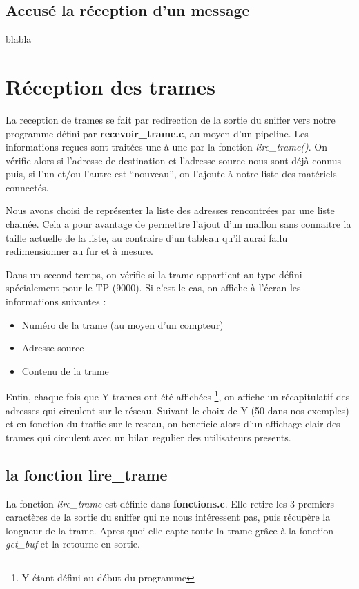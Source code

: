 \documentclass[a4paper,11pt]{article}
\begin{document}
	\subsection{Accusé la réception d'un message}
	blabla
	\section{Réception des trames}
	La reception de trames se fait par redirection de la sortie du sniffer vers notre programme défini par \textbf{recevoir\_trame.c}, au moyen d'un pipeline.
	Les informations reçues sont traitées une à une par la fonction \textit{lire\_trame()}. On vérifie alors si l'adresse de destination et l'adresse source nous sont déjà connus puis, si l'un et/ou l'autre est ``nouveau'', on l'ajoute à notre liste des matériels connectés.

	Nous avons choisi de représenter la liste des adresses rencontrées par une liste chainée. Cela a pour avantage de permettre l'ajout d'un maillon sans connaitre la taille actuelle de la liste, au contraire d'un tableau qu'il aurai fallu redimensionner au fur et à mesure.
	
	Dans un second temps, on vérifie si la trame appartient au type défini spécialement pour le TP (9000). Si c'est le cas, on affiche à l'écran les informations suivantes :
	\begin{itemize}
		\item Numéro de la trame (au moyen d'un compteur)
		\item Adresse source
		\item Contenu de la trame
	\end{itemize}

	Enfin, chaque fois que Y trames ont été affichées \footnote{Y étant défini au début du programme}, on affiche un récapitulatif des adresses qui circulent sur le réseau. Suivant le choix de Y (50 dans nos exemples) et en fonction du traffic sur le reseau, on beneficie alors d'un affichage clair des trames qui circulent avec un bilan regulier des utilisateurs presents. %
	\subsection{la fonction lire\_trame}
	La fonction \textit{lire\_trame} est définie dans \textbf{fonctions.c}. Elle retire les 3 premiers caractères de la sortie du sniffer qui ne nous intéressent pas, puis récupère la longueur de la trame. Apres quoi elle capte toute la trame grâce à la fonction \textit{get\_buf} et la retourne en sortie.
\end{document}
